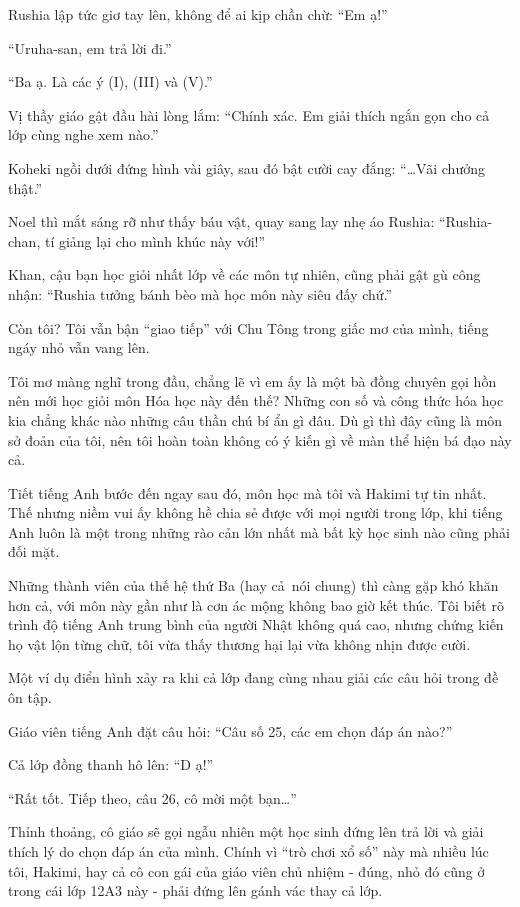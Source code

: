 \documentclass[../main.tex]{subfiles}
\begin{document}
Rushia lập tức giơ tay lên, không để ai kịp chần chừ: ``Em ạ!''

``Uruha-san, em trả lời đi.''

``Ba ạ. Là các ý (I), (III) và (V).''

Vị thầy giáo gật đầu hài lòng lắm: ``Chính xác. Em giải thích ngắn gọn cho cả lớp cùng nghe xem nào.''

Koheki ngồi dưới đứng hình vài giây, sau đó bật cười cay đắng: ``\dots Vãi chưởng thật.''

Noel thì mắt sáng rỡ như thấy báu vật, quay sang lay nhẹ áo Rushia: ``Rushia-chan, tí giảng lại cho mình khúc này với!''

Khan, cậu bạn học giỏi nhất lớp về các môn tự nhiên, cũng phải gật gù công nhận: ``Rushia tưởng bánh bèo mà học môn này siêu đấy chứ.''

Còn tôi? Tôi vẫn bận ``giao tiếp'' với Chu Tông trong giấc mơ của mình, tiếng ngáy nhỏ vẫn vang lên.

Tôi mơ màng nghĩ trong đầu, chẳng lẽ vì em ấy là một bà đồng chuyên gọi hồn nên mới học giỏi môn Hóa học này đến thế? Những con số và công thức hóa học kia chẳng khác nào những câu thần chú bí ẩn gì đâu. Dù gì thì đây cũng là môn sở đoản của tôi, nên tôi hoàn toàn không có ý kiến gì về màn thể hiện bá đạo này cả.

\ct

Tiết tiếng Anh bước đến ngay sau đó, môn học mà tôi và Hakimi tự tin nhất. Thế nhưng niềm vui ấy không hề chia sẻ được với mọi người trong lớp, khi tiếng Anh luôn là một trong những rào cản lớn nhất mà bất kỳ học sinh nào cũng phải đối mặt.

Những thành viên của thế hệ thứ Ba (hay cả\hll\ nói chung) thì càng gặp khó khăn hơn cả, với môn này gần như là cơn ác mộng không bao giờ kết thúc. Tôi biết rõ trình độ tiếng Anh trung bình của người Nhật không quá cao, nhưng chứng kiến họ vật lộn từng chữ, tôi vừa thấy thương hại lại vừa không nhịn được cười.

Một ví dụ điển hình xảy ra khi cả lớp đang cùng nhau giải các câu hỏi trong đề ôn tập.

Giáo viên tiếng Anh đặt câu hỏi: ``Câu số 25, các em chọn đáp án nào?''

Cả lớp đồng thanh hô lên: ``D ạ!''

``Rất tốt. Tiếp theo, câu 26, cô mời một bạn\dots''

Thỉnh thoảng, cô giáo sẽ gọi ngẫu nhiên một học sinh đứng lên trả lời và giải thích lý do chọn đáp án của mình. Chính vì ``trò chơi xổ số'' này mà nhiều lúc tôi, Hakimi, hay cả cô con gái của giáo viên chủ nhiệm - đúng, nhỏ đó cũng ở trong cái lớp 12A3 này - phải đứng lên gánh vác thay cả lớp.
\end{document}
